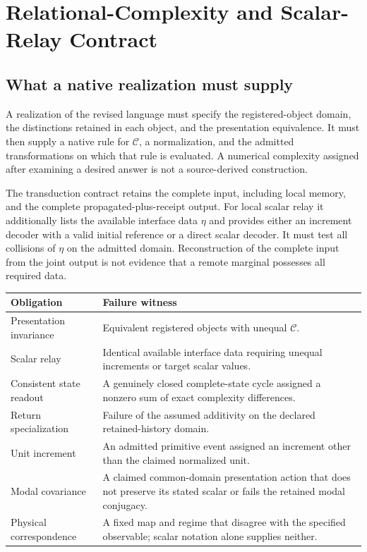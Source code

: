 \section{Relational-Complexity and Scalar-Relay Contract}\label{app:complexitycontract}
\subsection{What a native realization must supply}
A realization of the revised language must specify the registered-object domain, the distinctions retained in each object, and the presentation equivalence. It must then supply a native rule for $\mathcal C$, a normalization, and the admitted transformations on which that rule is evaluated. A numerical complexity assigned after examining a desired answer is not a source-derived construction.

The transduction contract retains the complete input, including local memory, and the complete propagated-plus-receipt output. For local scalar relay it additionally lists the available interface data $\eta$ and provides either an increment decoder with a valid initial reference or a direct scalar decoder. It must test all collisions of $\eta$ on the admitted domain. Reconstruction of the complete input from the joint output is not evidence that a remote marginal possesses all required data.

\noindent\begin{tabularx}{\textwidth}{@{}p{}X@{}}
\toprule
Obligation & Failure witness \\
\midrule
Presentation invariance & Equivalent registered objects with unequal $\mathcal C$. \\
Scalar relay & Identical available interface data requiring unequal increments or target scalar values. \\
Consistent state readout & A genuinely closed complete-state cycle assigned a nonzero sum of exact complexity differences. \\
Return specialization & Failure of the assumed additivity on the declared retained-history domain. \\
Unit increment & An admitted primitive event assigned an increment other than the claimed normalized unit. \\
Modal covariance & A claimed common-domain presentation action that does not preserve its stated scalar or fails the retained modal conjugacy. \\
Physical correspondence & A fixed map and regime that disagree with the specified observable; scalar notation alone supplies neither. \\
\bottomrule
\end{tabularx}

